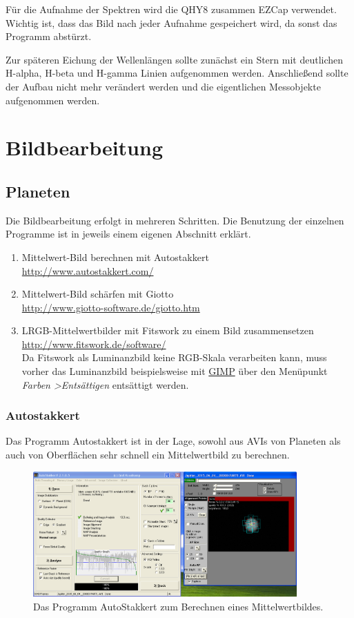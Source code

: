 \documentclass[10pt,a4paper,titlepage]{article}
\begin{document}
Für die Aufnahme der Spektren wird die QHY8 zusammen EZCap verwendet. Wichtig ist, dass das Bild nach jeder Aufnahme gespeichert wird, da sonst das Programm abstürzt.

Zur späteren Eichung der Wellenlängen sollte zunächst ein Stern mit deutlichen H-alpha, H-beta und H-gamma Linien aufgenommen werden. Anschließend sollte der Aufbau nicht mehr verändert werden und die eigentlichen Messobjekte aufgenommen werden.

\section{Bildbearbeitung}
\subsection{Planeten}
Die Bildbearbeitung erfolgt in mehreren Schritten. Die Benutzung der einzelnen Programme ist in jeweils einem eigenen Abschnitt erklärt.
\begin{enumerate}
\item Mittelwert-Bild berechnen mit Autostakkert \\ \url{http://www.autostakkert.com/}
\item Mittelwert-Bild schärfen mit Giotto \\ \url{http://www.giotto-software.de/giotto.htm}
\item LRGB-Mittelwertbilder mit Fitswork zu einem Bild zusammensetzen \\ \url{http://www.fitswork.de/software/} \\
Da Fitswork als Luminanzbild keine RGB-Skala verarbeiten kann, muss vorher das Luminanzbild beispielsweise mit \href{http://gimp.org}{GIMP} über den Menüpunkt \textit{Farben \textgreater Entsättigen} entsättigt werden.
\end{enumerate}
\subsubsection{Autostakkert}
Das Programm Autostakkert ist in der Lage, sowohl aus AVIs von Planeten als auch von Oberflächen sehr schnell ein Mittelwertbild zu berechnen.

\begin{figure}[h!]
  \centering
    \includegraphics[width=0.9\textwidth]{AutoStakkert}
  \caption{Das Programm AutoStakkert zum Berechnen eines Mittelwertbildes.}
  \label{fig:autostakkert}
\end{figure}
\end{document}
